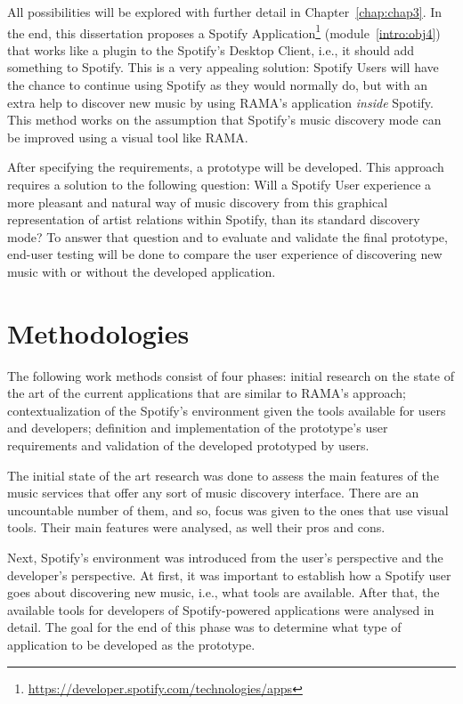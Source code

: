   All possibilities will be explored with further detail in Chapter~\ref{chap:chap3}.
  In the end, this dissertation proposes a Spotify Application\footnote{\url{https://developer.spotify.com/technologies/apps}} (module~\ref{intro:obj4}) that works like a plugin to the Spotify's Desktop Client, i.e., it should add something to Spotify.
  This is a very appealing solution: Spotify Users will have the chance to continue using Spotify as they would normally do, but with an extra help to discover new music by using RAMA's application \emph{inside} Spotify. 
  This method works on the assumption that Spotify's music discovery mode can be improved using a visual tool like RAMA.

  After specifying the requirements, a prototype will be developed.
  This approach requires a solution to the following question: Will a Spotify User experience a more pleasant and natural way of music discovery from this graphical representation of artist relations within Spotify, than its standard discovery mode?
  To answer that question and to evaluate and validate the final prototype, end-user testing will be done to compare the user experience of discovering new music with or without the developed application.

\section{Methodologies}
\label{sec:methodologies}

  The following work methods consist of four phases: initial research on the state of the art of the current applications that are similar to RAMA's approach; contextualization of the Spotify's environment given the tools available for users and developers; definition and implementation of the prototype's user requirements and validation of the developed prototyped by users.

  The initial state of the art research was done to assess the main features of the music services that offer any sort of music discovery interface.
  There are an uncountable number of them, and so, focus was given to the ones that use visual tools.
  Their main features were analysed, as well their pros and cons.

  Next, Spotify's environment was introduced from the user's perspective and the developer's perspective.
  At first, it was important to establish how a Spotify user goes about discovering new music, i.e., what tools are available.
  After that, the available tools for developers of Spotify-powered applications were analysed in detail.
  The goal for the end of this phase was to determine what type of application to be developed as the prototype. 

